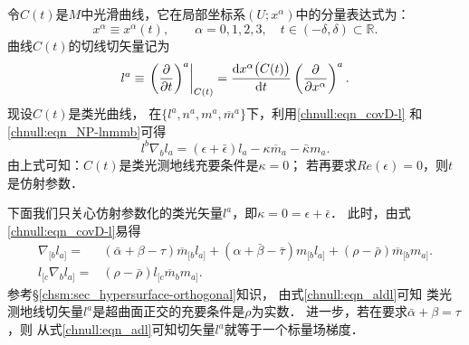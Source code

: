 令$C(t)$是$M$中光滑曲线，它在局部坐标系$(U;x^\alpha)$中的分量表达式为：
\begin{equation}
    x^\alpha\equiv x^\alpha(t),\qquad \alpha =0,1,2,3,
    \quad t\in (-\delta,\delta)\subset \mathbb{R} .
\end{equation}
曲线$C(t)$的切线切矢量记为
\begin{equation}\label{chnull:eqn_T}
    l^a \equiv \left.\left(\frac{\partial }{\partial t}\right)^a\right|_{C(t)}
    =\frac{{\rm d} x^\alpha\bigl(C(t)\bigr)}{{\rm d} t}
    \left(\frac{\partial }{\partial x^\alpha}\right)^a .
\end{equation}
现设$C(t)$是类光曲线，
在$\{l^a, n^a, m^a, \overline{m}^a\}$下，利用\eqref{chnull:eqn_covD-l}
和\eqref{chnull:eqn_NP-lnmmb}可得
\begin{equation}
    l^b\nabla_{b} l_a  = (\epsilon+\bar{\epsilon})  l_a
    -\kappa  \overline{m}_a  -\bar{\kappa}  m_a  .
\end{equation}
由上式可知：$C(t)$是类光测地线充要条件是$\kappa=0$；
若再要求$Re(\epsilon)=0$，则$t$是仿射参数．

下面我们只关心仿射参数化的类光矢量$l^a$，即$\kappa=0=\epsilon+\bar{\epsilon}$．
此时，由式\eqref{chnull:eqn_covD-l}易得
\begin{align}
    \nabla_{[b} l_{a]}
    =&  (\bar{\alpha}+\beta-\tau) \overline{m}_{[b} l_{a]}
    + (\alpha+\bar{\beta}-\bar{\tau}) m_{[b} l_{a]}
    +(\rho-\bar{\rho}) \overline{m}_{[b} m_{a]} . \label{chnull:eqn_adl}\\
    l_{[c}\nabla_{b} l_{a]}  =& (\rho-\bar{\rho})
    l_{[c}\overline{m}_{b} m_{a]}. \label{chnull:eqn_aldl}
\end{align}
参考\S\ref{chsm:sec_hypersurface-orthogonal}知识，
由式\eqref{chnull:eqn_aldl}可知
类光测地线切矢量$l^a$是超曲面正交的充要条件是$\rho$为实数．
进一步，若在要求$\bar{\alpha}+\beta=\tau$，则
从式\eqref{chnull:eqn_adl}可知切矢量$l^a$就等于一个标量场梯度．

